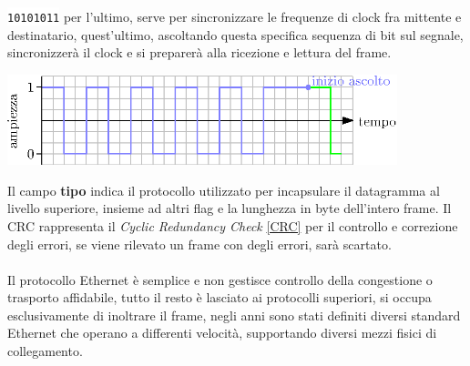 \documentclass[12pt, letterpaper]{article}
\newcommand{\codee}[1]{\colorbox{white}{\texttt{#1}}}
\newcommand{\acc}{\\\hphantom{}\\}
\begin{document}
\codee{10101011} per l'ultimo, serve per sincronizzare le frequenze di clock fra mittente e destinatario, quest'ultimo, 
ascoltando questa specifica sequenza di bit sul segnale, sincronizzerà il clock e si preparerà alla ricezione 
e lettura del frame.\begin{center}
    \includegraphics[width=0.85\textwidth ]{images/preambolo.eps}
\end{center}
Il campo \textbf{tipo} indica il protocollo utilizzato per incapsulare il datagramma al livello superiore, insieme 
ad altri flag e la lunghezza in byte dell'intero frame. Il CRC rappresenta il \textit{Cyclic Redundancy Check} \ref{CRC} 
per il controllo e correzione degli errori, se viene rilevato un frame con degli errori, sarà scartato.\acc 
Il protocollo Ethernet è semplice e non gestisce controllo della congestione o trasporto affidabile, tutto il resto 
è lasciato ai protocolli superiori, si occupa esclusivamente di inoltrare il frame, negli anni sono stati definiti 
diversi standard Ethernet che operano a differenti velocità, supportando diversi mezzi fisici di collegamento. 
\end{document}
